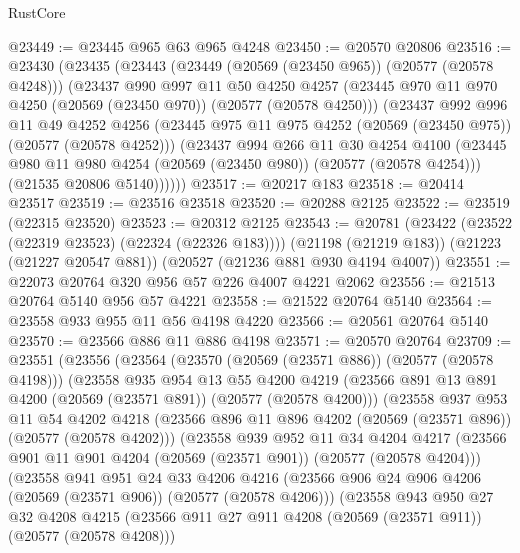 \begin{lexlean}{RustCore}
\begin{coremodule}
@23449 := @23445 @965 @63 @965 @4248
@23450 := @20570 @20806
@23516 := @23430
    (@23435
      (@23443
        (@23449 (@20569 (@23450 @965)) (@20577 (@20578 @4248)))
        (@23437
          @990
          @997
          @11
          @50
          @4250
          @4257
          (@23445 @970 @11 @970 @4250 (@20569 (@23450 @970)) (@20577 (@20578 @4250)))
          (@23437
            @992
            @996
            @11
            @49
            @4252
            @4256
            (@23445 @975 @11 @975 @4252 (@20569 (@23450 @975)) (@20577 (@20578 @4252)))
            (@23437
              @994
              @266
              @11
              @30
              @4254
              @4100
              (@23445 @980 @11 @980 @4254 (@20569 (@23450 @980)) (@20577 (@20578 @4254)))
              (@21535 @20806 @5140))))))
@23517 := @20217 @183
@23518 := @20414 @23517
@23519 := @23516 @23518
@23520 := @20288 @2125
@23522 := @23519 (@22315 @23520)
@23523 := @20312 @2125
@23543 := @20781
    (@23422 (@23522 (@22319 @23523) (@22324 (@22326 @183))))
    (@21198 (@21219 @183))
    (@21223 (@21227 @20547 @881))
    (@20527 (@21236 @881 @930 @4194 @4007))
@23551 := @22073 @20764 @320 @956 @57 @226 @4007 @4221 @2062
@23556 := @21513 @20764 @5140 @956 @57 @4221
@23558 := @21522 @20764 @5140
@23564 := @23558 @933 @955 @11 @56 @4198 @4220
@23566 := @20561 @20764 @5140
@23570 := @23566 @886 @11 @886 @4198
@23571 := @20570 @20764
@23709 := @23551
    (@23556
      (@23564
        (@23570 (@20569 (@23571 @886)) (@20577 (@20578 @4198)))
        (@23558
          @935
          @954
          @13
          @55
          @4200
          @4219
          (@23566 @891 @13 @891 @4200 (@20569 (@23571 @891)) (@20577 (@20578 @4200)))
          (@23558
            @937
            @953
            @11
            @54
            @4202
            @4218
            (@23566 @896 @11 @896 @4202 (@20569 (@23571 @896)) (@20577 (@20578 @4202)))
            (@23558
              @939
              @952
              @11
              @34
              @4204
              @4217
              (@23566 @901 @11 @901 @4204 (@20569 (@23571 @901)) (@20577 (@20578 @4204)))
              (@23558
                @941
                @951
                @24
                @33
                @4206
                @4216
                (@23566 @906 @24 @906 @4206 (@20569 (@23571 @906)) (@20577 (@20578 @4206)))
                (@23558
                  @943
                  @950
                  @27
                  @32
                  @4208
                  @4215
                  (@23566 @911 @27 @911 @4208 (@20569 (@23571 @911)) (@20577 (@20578 @4208)))

\end{coremodule}
\end{lexlean}

